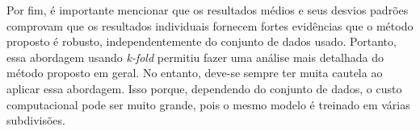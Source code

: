 \begin{table}[!ht]
\caption{Resultados finais do método proposto.}
\label{tab:resultados-finais-metodo}
\centering
{}
\end{table}

Por fim, é importante mencionar que os resultados médios e seus desvios padrões comprovam que os resultados individuais fornecem fortes evidências que o método proposto é robusto, independentemente do conjunto de dados usado. Portanto, essa abordagem usando \textit{k-fold} permitiu fazer uma análise mais detalhada do método proposto em geral. No entanto, deve-se sempre ter muita cautela ao aplicar essa abordagem. Isso porque, dependendo do conjunto de dados, o custo computacional pode ser muito grande, pois o mesmo modelo é treinado em várias subdivisões.

